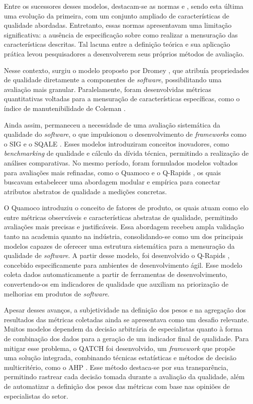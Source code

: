 Entre os sucessores desses modelos, destacam-se as normas  e , sendo esta última uma evolução da primeira, com um conjunto ampliado de características de qualidade abordadas. Entretanto, essas normas apresentavam uma limitação significativa: a ausência de especificação sobre como realizar a mensuração das características descritas. Tal lacuna entre a definição teórica e sua aplicação prática levou pesquisadores a desenvolverem seus próprios métodos de avaliação.

Nesse contexto, surgiu o modelo proposto por Dromey \cite{dromey1995model}, que atribuía propriedades de qualidade diretamente a componentes de \textit{software}, possibilitando uma avaliação mais granular. Paralelamente, foram desenvolvidas métricas quantitativas voltadas para a mensuração de características específicas, como o índice de manutenibilidade de Coleman \cite{coleman1992maintainability}.

Ainda assim, permaneceu a necessidade de uma avaliação sistemática da qualidade do \textit{software}, o que impulsionou o desenvolvimento de \textit{frameworks} como o SIG \cite{heitlager2007sig} e o SQALE \cite{letouzey2010sqale}. Esses modelos introduziram conceitos inovadores, como \textit{benchmarking} de qualidade e cálculo da dívida técnica, permitindo a realização de análises comparativas. No mesmo período, foram formulados modelos voltados para avaliações mais refinadas, como o Quamoco \cite{wagner2012quamoco} e o Q-Rapids \cite{lopez2018qrapids}, os quais buscavam estabelecer uma abordagem modular e empírica para conectar atributos abstratos de qualidade a medições concretas.

O Quamoco \cite{wagner2012quamoco} introduziu o conceito de fatores de produto, os quais atuam como elo entre métricas observáveis e características abstratas de qualidade, permitindo avaliações mais precisas e justificáveis. Essa abordagem recebeu ampla validação tanto na academia quanto na indústria, consolidando-se como um dos principais modelos capazes de oferecer uma estrutura sistemática para a mensuração da qualidade de \textit{software}. A partir desse modelo, foi desenvolvido o Q-Rapids \cite{lopez2018qrapids}, concebido especificamente para ambientes de desenvolvimento ágil. Esse modelo coleta dados automaticamente a partir de ferramentas de desenvolvimento, convertendo-os em indicadores de qualidade que auxiliam na priorização de melhorias em produtos de \textit{software}.

Apesar desses avanços, a subjetividade na definição dos pesos e na agregação dos resultados das métricas coletadas ainda se apresentava como um desafio relevante. Muitos modelos dependem da decisão arbitrária de especialistas quanto à forma de combinação dos dados para a geração de um indicador final de qualidade. Para mitigar esse problema, o QATCH \cite{siavvas2017qatch} foi desenvolvido, um \textit{framework} que propõe uma solução integrada, combinando técnicas estatísticas e métodos de decisão multicritério, como o AHP \cite{ahp}. Esse método destaca-se por sua transparência, permitindo rastrear cada decisão tomada durante a avaliação da qualidade, além de automatizar a definição dos pesos das métricas com base nas opiniões de especialistas do setor.

